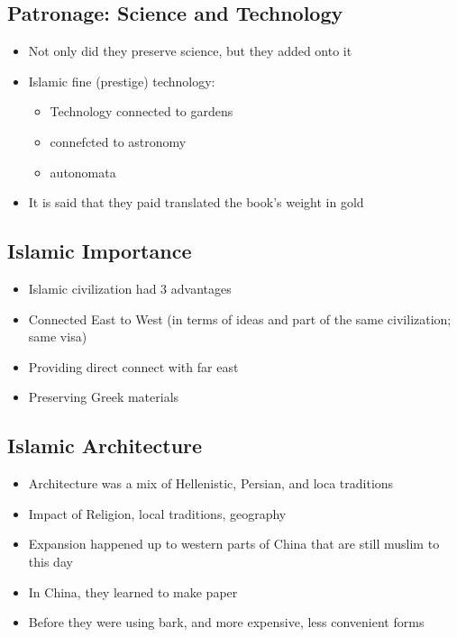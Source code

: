 \documentclass{article}
\begin{document}
\subsection{Patronage: Science and Technology}
\begin{itemize}
  \item Not only did they preserve science, but
    they added onto it
  \item Islamic fine (prestige) technology:
    \begin{itemize}
      \item Technology connected to gardens
      \item connefcted to astronomy
      \item autonomata
    \end{itemize}
  \item It is said that they paid translated the book's weight in gold
\end{itemize}

\subsection{Islamic Importance}
\begin{itemize}
  \item Islamic civilization had 3 advantages
  \item Connected East to West (in terms of ideas and part of the same civilization; same visa)
  \item Providing direct connect with far east
  \item Preserving Greek materials
\end{itemize}


\subsection{Islamic Architecture}
\begin{itemize}
\item Architecture was a mix of
  Hellenistic, Persian, and loca traditions
\item Impact of Religion, local traditions, geography
\item Expansion happened up to western parts of China that
  are still muslim to this day
\item In China, they learned to make paper
\item Before they were using bark, and more expensive,
  less convenient forms
\end{itemize}
\end{document}
